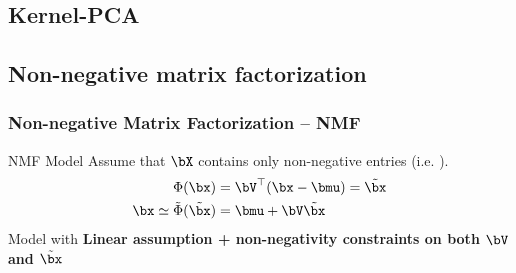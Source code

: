 \documentclass{beamer}\usepackage[]{graphicx}\usepackage[]{color}
\begin{document}
\subsection{Kernel-PCA}

\subsection{Non-negative matrix factorization}




\begin{frame}
  \frametitle{Non-negative Matrix Factorization -- NMF}

  \begin{block}{NMF Model}
    Assume that $\bX$ contains only non-negative entries (i.e. ).
    \begin{align*}
      \Phi(\bx) & = \bV^\top(\bx-\bmu)  = \tilde\bx \\  
      \bx \simeq \tilde{\Phi}(\tilde\bx) & = \bmu + \bV \tilde\bx
    \end{align*}
    \rsa Model with \alert{\bf Linear assumption + non-negativity constraints on both $\bV$ and $\tilde\bx$}
  \end{block}

  
\end{frame}
\end{document}

